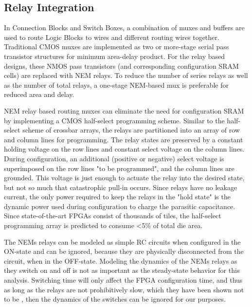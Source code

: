 \documentclass[twoside,twocolumn]{article}
\begin{document}

\subsection{Relay Integration}
In Connection Blocks and Switch Boxes, a combination of muxes and buffers are used to route Logic Blocks to wires and different routing wires together. Traditional CMOS muxes are implemented as two or more-stage serial pass transistor structures for minimum area-delay product. For the relay based designs, these NMOS pass transistors (and corresponding configuration SRAM cells) are replaced with NEM relays. To reduce the number of series relays as well as the number of total relays, a one-stage NEM-based mux is preferable for reduced area and delay\cite{chen_efficient_2010}.

NEM relay based routing muxes can eliminate the need for configuration SRAM by implementing a CMOS half-select programming scheme\cite{chen_efficient_2010}. Similar to the half-select scheme of crossbar arrays, the relays are partitioned into an array of row and column lines for programming. The relay states are preserved by a constant holding voltage on the row lines and constant select voltage on the column lines. During configuration, an additional (positive or negative) select voltage is superimposed on the row lines "to be programmed", and the column lines are grounded. This voltage is just enough to actuate the relay into the desired state, but not so much that catastrophic pull-in occurs. Since relays have no leakage current, the only power required to keep the relays in the "hold state" is the dynamic power used during configuration to charge the parasitic capacitance. Since state-of-the-art FPGAs consist of thousands of tiles, the half-select programming array is predicted to consume <5\% of total die area.

The NEMs relays can be modeled as simple RC circuits when configured in the 
ON-state \cite{chen_efficient_2010} \cite{chen_integrated_2008} and can be ignored, 
because they are physically disconnected from the 
circuit, when in the OFF-state. Modeling the dynamics of the NEMs relays
as they switch on and off is not as important as the steady-state behavior
for this analysis. Switching time will only affect the FPGA configuration
time, and thus as long as the relays are not prohibitively slow, which they
have been shown not to be \cite{chen_integrated_2008}, then the dynamics of the switches can be 
ignored for our purposes.
\end{document}
